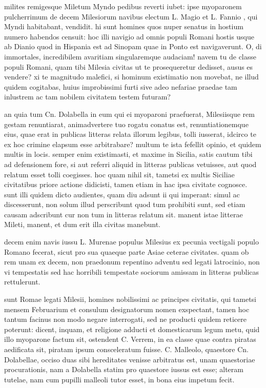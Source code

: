  milites remigesque Miletum Myndo pedibus reverti iubet: ipse myoparonem pulcherrimum de decem Milesiorum navibus electum L. Magio et L. Fannio , qui Myndi habitabant, vendidit. hi sunt homines quos nuper senatus in hostium numero habendos censuit: hoc illi navigio ad omnis populi Romani hostis usque ab Dianio quod in Hispania est ad Sinopam quae in Ponto est navigaverunt. O, di immortales, incredibilem avaritiam singularemque audaciam! navem tu de classe populi Romani, quam tibi Milesia civitas ut te prosequeretur dedisset, ausus es vendere? xi te magnitudo malefici, si hominum existimatio non movebat, ne illud quidem cogitabas, huius improbissimi furti sive adeo nefariae praedae tam inlustrem ac tam nobilem civitatem testem futuram?

 an quia tum Cn. Dolabella in eum qui ei myoparoni praefuerat, Milesiisque rem gestam renuntiarat, animadvertere tuo rogatu conatus est, renuntiationemque eius, quae erat in publicas litteras relata illorum legibus, tolli iusserat, idcirco te ex hoc crimine elapsum esse arbitrabare? multum te ista fefellit opinio, et quidem multis in locis. semper enim existimasti, et maxime in Sicilia, satis cautum tibi ad defensionem fore, si aut referri aliquid in litteras publicas vetuisses, aut quod relatum esset tolli coegisses. hoc quam nihil sit, tametsi ex multis Siciliae civitatibus priore actione didicisti, tamen etiam in hac ipsa civitate cognosce. sunt illi quidem dicto audientes, quam diu adsunt ii qui imperant: simul ac discesserunt, non solum illud perscribunt quod tum prohibiti sunt, sed etiam causam adscribunt cur non tum in litteras relatum sit. manent istae litterae Mileti, manent, et dum erit illa civitas manebunt.

 decem enim navis iussu L. Murenae populus Milesius ex pecunia vectigali populo Romano fecerat, sicut pro sua quaeque parte Asiae ceterae civitates. quam ob rem unam ex decem, non praedonum repentino adventu sed legati latrocinio, non vi tempestatis sed hac horribili tempestate sociorum amissam in litteras publicas rettulerunt.

 sunt Romae legati Milesii, homines nobilissimi ac principes civitatis, qui tametsi mensem Februarium et consulum designatorum nomen exspectant, tamen hoc tantum facinus non modo negare interrogati, sed ne producti quidem reticere poterunt: dicent, inquam, et religione adducti et domesticarum legum metu, quid illo myoparone factum sit, ostendent C. Verrem, in ea classe quae contra piratas aedificata sit, piratam ipsum consceleratum fuisse. C. Malleolo, quaestore Cn. Dolabellae, occiso duas sibi hereditates venisse arbitratus est, unam quaestoriae procurationis, nam a Dolabella statim pro quaestore iussus est esse; alteram tutelae, nam cum pupilli malleoli tutor esset, in bona eius impetum fecit.

